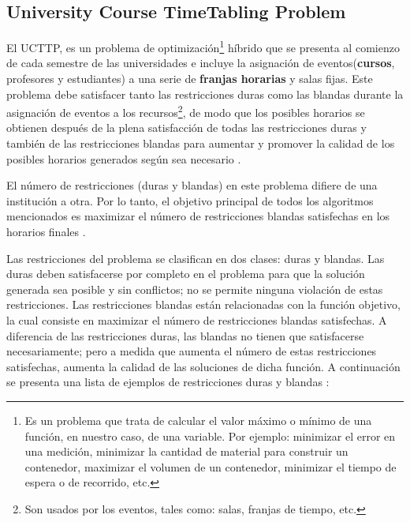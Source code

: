 \subsection{University Course TimeTabling Problem}

El UCTTP, es un problema de optimización\footnote{Es un problema que trata de calcular el valor máximo o mínimo de una función, en nuestro caso, de una variable. Por ejemplo: minimizar el error en una medición, minimizar la cantidad de material para construir un contenedor, maximizar el volumen de un contenedor, minimizar el tiempo de espera o de recorrido, etc.} híbrido que se presenta al comienzo de cada semestre de las universidades e incluye la asignación de eventos(\textbf{cursos}, profesores y estudiantes) a una serie de \textbf{franjas horarias} y salas fijas. Este problema debe satisfacer tanto las restricciones duras como las blandas durante la asignación de eventos a los recursos\footnote{Son usados por los eventos, tales como: salas, franjas de tiempo, etc.}, de modo que los posibles horarios se obtienen después de la plena satisfacción de todas las restricciones duras y también de las restricciones blandas para aumentar y promover la calidad de los posibles horarios generados según sea necesario \cite{UCTTP_ThreePhaseApproach}.\newline

El número de restricciones (duras y blandas) en este problema difiere de una institución a otra. Por lo tanto, el objetivo principal de todos los algoritmos mencionados es maximizar el número de restricciones blandas satisfechas en los horarios finales \cite{article_1445178}.\newline

Las restricciones del problema se clasifican en dos clases: duras y blandas. Las duras deben satisfacerse por completo en el problema para que la solución generada sea posible y sin conflictos; no se permite ninguna violación de estas restricciones. Las restricciones blandas están relacionadas con la función objetivo, la cual consiste en maximizar el número de restricciones blandas satisfechas. A diferencia de las restricciones duras, las blandas no tienen que satisfacerse necesariamente; pero a medida que aumenta el número de estas restricciones satisfechas, aumenta la calidad de las soluciones de dicha función. A continuación se presenta una lista de ejemplos de restricciones duras y blandas \cite{BABAEI201543}:

